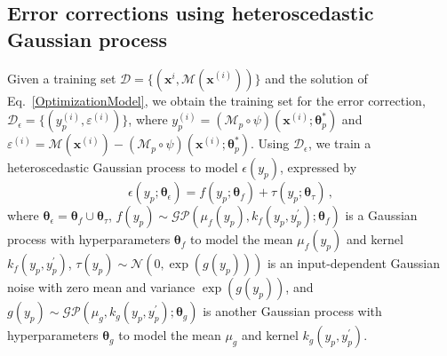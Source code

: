 \documentclass[number,preprint,3p]{elsarticle}
\newcommand{\1}[2]{\mathbb{I}_{#1}\left(#2\right)}
\newcommand{\vect}[1]{\boldsymbol{#1}}
\begin{document}
	
	
	\subsection{Error corrections using heteroscedastic Gaussian process}\label{Sec:ErrorCorrection}
	\noindent Given a training set $\mathcal{D}=\{(\vect x^{i},\mathcal{M}(\vect x^{(i)}))\}$ and the solution of Eq.~\eqref{OptimizationModel}, we obtain the training set for the error correction, $\mathcal{D}_\epsilon=\{(y_p^{(i)},\varepsilon^{(i)})\}$, where $y_p^{(i)}=(\mathcal{M}_p\circ\psi)(\vect x^{(i)};\vect\theta_p^*)$ and $\varepsilon^{(i)}=\mathcal{M}(\vect x^{(i)})-(\mathcal{M}_p\circ\psi)(\vect x^{(i)};\vect\theta_p^*)$. Using $\mathcal{D}_\epsilon$, we train a heteroscedastic Gaussian process \cite{lazaro2013retrieval,rogers2020probabilistic,kim2023estimation} to model $\epsilon(y_p)$, expressed by
	\begin{equation}\label{hGPerrorcorrection}
		{\epsilon}(y_{p};\vect\theta_\epsilon)=f(y_{p};\vect\theta_f)+\tau(y_{p};\vect\theta_\tau)\,,
	\end{equation}
	where $\vect\theta_\epsilon=\vect\theta_f\cup\vect\theta_\tau$, $f(y_{p}) \sim \mathcal{GP}(\mu_{f}(y_{p}),k _{f}(y_{p},y_{p}^{\prime});\vect{\theta}_{f})$ is a Gaussian process with hyperparameters $\vect{\theta}_{f}$ to model the mean $\mu_{f}(y_{p})$ and kernel $k _{f}(y_{p},y_{p}^{\prime})$, $\tau(y_{p}) \sim \mathcal{N}(0,\exp(g(y_{p})))$ is an input-dependent Gaussian noise with zero mean and variance $\exp(g(y_{p}))$, and $g(y_{p})\sim \mathcal{GP}(\mu_{g},k _{g}(y_{p},y_{p}^{\prime});\vect{\theta}_{g})$ is another Gaussian process with hyperparameters $\vect{\theta}_{g}$ to model the mean $\mu_{g}$ and kernel $k _{g}(y_{p},y_{p}^{\prime})$. %
	
\end{document}
